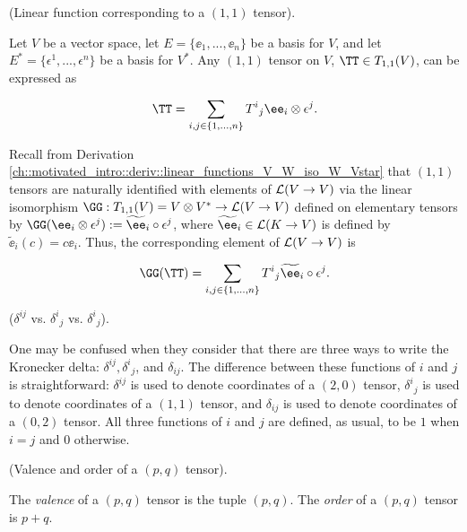 \begin{example}
\label{ch::motivated_intro::thm::linear_fn_cooresp_to_1_1_tensor}
    (Linear function corresponding to a $(1, 1)$ tensor).

    Let $V$ be a vector space, let $E = \{\ee_1, ..., \ee_n\}$ be a basis for $V$, and let $E^* = \{\epsilon^1, ..., \epsilon^n\}$ be a basis for $V^*$. Any $(1, 1)$ tensor on $V$, $\TT \in T_{1,1}(V)$, can be expressed as

    \begin{align*}
        \TT = \sum_{i,j \in \{1, ..., n\}} T^i{}_j \ee_i \otimes \epsilon^j.
    \end{align*}

    Recall from Derivation \ref{ch::motivated_intro::deriv::linear_functions_V_W_iso_W_Vstar} that $(1, 1)$ tensors are naturally identified with elements of $\mathcal{L}(V \rightarrow V)$ via the linear isomorphism $\GG:T_{1,1}(V) = V \otimes V^* \rightarrow \LLLL(V \rightarrow V)$ defined on elementary tensors by $\GG(\ee_i \otimes \epsilon^j) := \widetilde{\ee}_i \circ \epsilon^j$, where $\widetilde{\ee}_i \in \LLLL(K \rightarrow V)$ is defined by $\widetilde{\ee}_i(c) = c\ee_i$. Thus, the corresponding element of $\mathcal{L}(V \rightarrow V)$ is

    \begin{align*}
        \GG(\TT) = \sum_{i,j \in \{1, ..., n\}} T^i{}_j \widetilde{\ee}_i \circ \epsilon^j.
    \end{align*}
\end{example}

\begin{remark}
    ($\delta^{ij}$ vs. $\delta^i{}_j$ vs. $\delta^i{}_j$).
    
    One may be confused when they consider that there are three ways to write the Kronecker delta: $\delta^{ij}, \delta^i{}_j$, and $\delta_{ij}$. The difference between these functions of $i$ and $j$ is straightforward: $\delta^{ij}$ is used to denote coordinates of a $(2, 0)$ tensor, $\delta^i{}_j$ is used to denote coordinates of a $(1, 1)$ tensor, and $\delta_{ij}$ is used to denote coordinates of a $(0, 2)$ tensor. All three functions of $i$ and $j$ are defined, as usual, to be $1$ when $i = j$ and $0$ otherwise.
\end{remark}

\begin{defn}
    (Valence and order of a $(p, q)$ tensor). 
    
    The \textit{valence} of a $(p, q)$ tensor is the tuple $(p, q)$. The \textit{order} of a $(p, q)$ tensor is $p + q$.
\end{defn}

